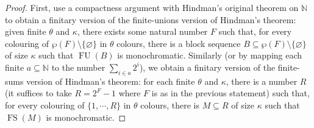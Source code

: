 \documentclass[10pt,a4paper]{amsart}
\begin{document}
\begin{proof}
    First, use a compactness argument with Hindman's original theorem on $\mathbb N$ to obtain a finitary version of the finite-unions version of Hindman's theorem: given finite $\theta$ and $\kappa$, there exists some natural number $F$ such that, for every colouring of $\wp(F)\setminus\{\varnothing\}$ in $\theta$ colours, there is a block sequence $B\subseteq\wp(F)\setminus\{\varnothing\}$ of size $\kappa$ such that $\operatorname{FU}(B)$ is monochromatic. Similarly (or by mapping each finite $a\subseteq\mathbb N$ to the number $\sum_{i\in a}2^i$), we obtain a finitary version of the finite-sums version of Hindman's theorem: for each finite $\theta$ and $\kappa$, there is a number $R$ (it suffices to take $R=2^{F}-1$ where $F$ is as in the previous statement) such that, for every colouring of $\{1,\cdots,R\}$ in $\theta$ colours, there is $M\subseteq R$ of size $\kappa$ such that $\operatorname{FS}(M)$ is monochromatic.
    

\end{proof}
\end{document}
